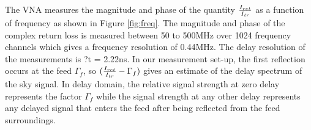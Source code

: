 \documentclass[iop]{emulateapj}
\begin{document}
The VNA measures the magnitude and phase of the quantity ${I_{ret}\over I_{tr}}$
as a function of frequency as shown in Figure \ref{fig:freq}. The magnitude and phase of the complex return loss is measured between 50 to 500MHz over 1024 frequency channels which gives a frequency resolution of 0.44MHz. The delay resolution of the measurements is ?t = 2.22ns. In our measurement
set-up, the first reflection occurs at the feed $\Gamma_{f}$, so
$({I_{ret} \over I_{tr} }  - \Gamma_{f}) $ gives an estimate of the delay
spectrum of the sky signal. In delay domain, the relative signal strength at
zero delay represents the factor $\Gamma_{f}$ while the signal strength at any
other delay represents any delayed signal that enters the feed after being
reflected from the feed surroundings. 



\end{document}
